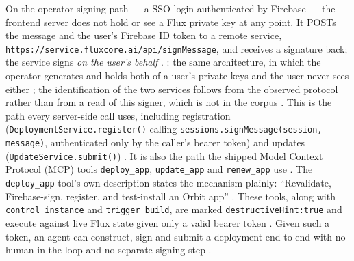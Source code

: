 On the operator-signing path — a \FluxCore SSO login authenticated by Firebase — the
frontend server does not hold or see a Flux private key at any point. It POSTs the message
and the user's Firebase ID token to a remote service,
\texttt{https:/\allowbreak{}/\allowbreak{}service.\allowbreak{}fluxcore.\allowbreak{}ai/\allowbreak{}api/\allowbreak{}signMessage},
and receives a signature back; the service signs \emph{on the user's behalf} \shipped
{}
. : the same
architecture, in which the operator generates and holds both of a user's private keys and
the user never sees either 
; the identification of the two
services follows from the observed protocol rather than from a read of this signer, which
is not in the corpus \srcinferred. This is the path
every server-side call uses, including registration
(\texttt{DeploymentService.\allowbreak{}register()} calling \texttt{sessions.\allowbreak{}signMessage(session, message)},
authenticated only by the caller's bearer token) and updates
(\texttt{UpdateService.\allowbreak{}submit()}) \shipped
{}
. It is also the
path the shipped Model Context Protocol (MCP) tools \texttt{deploy\_app},
\texttt{update\_app} and \texttt{renew\_app} use \shipped
{}
. The \texttt{deploy\_app}
tool's own description states the mechanism plainly: ``Revalidate, Firebase-sign,
register, and test-install an Orbit app'' \shipped
{}. These tools, along
with \texttt{control\_instance} and \texttt{trigger\_build}, are marked
\texttt{destructive\allowbreak{}Hint:\allowbreak{}true} and execute against live Flux state given only a valid
bearer token \shipped {}.
Given such a token, an agent can construct, sign and submit a deployment end to end with
no human in the loop and no separate signing step \shipped
{}
.

